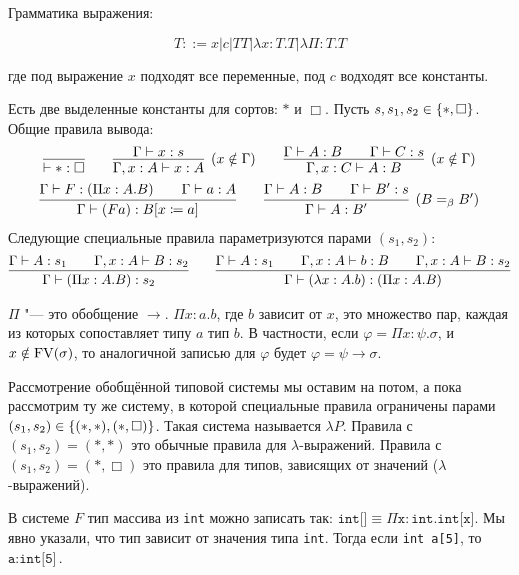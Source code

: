 \begin{definition}
Грамматика выражения:
\begin{bnf}
\[
    T ::= x | c | T T | \lambda x : T . T | \lambda \Pi : T . T
\]
\end{bnf}%
где под выражение $x$ подходят все переменные, под $c$ водходят все константы.

Есть две выделенные константы для сортов: $*$ и $\Box$.
Пусть $s, s_1, s_2 \in \left\{*, \Box\right\}$. Общие правила вывода:
\inferspacing
\begin{gather*}
    \infer{\vdash * : \Box}{} \qquad
    \infer[(x \notin \Gamma)]{\Gamma, x : A \vdash x : A}{\Gamma \vdash x : s} \qquad
    \infer[(x \notin \Gamma)]{\Gamma, x : C \vdash A : B}{\Gamma \vdash A : B && \Gamma \vdash C : s} \\
    \infer{\Gamma \vdash (Fa) : B [x \coloneqq a]}{\Gamma \vdash F : \left(\Pi x : A . B\right) && \Gamma \vdash a : A} \qquad
    \infer[(B =_\beta B')]{\Gamma \vdash A : B'}{\Gamma \vdash A : B \vphantom{(} && \Gamma \vdash B' : s} %
\end{gather*}%
Следующие специальные правила параметризуются парами $(s_1, s_2)$:
\begin{gather*}
    \infer{\Gamma \vdash (\Pi x : A . B) : s_2}{\Gamma \vdash A : s_1 && \Gamma, x : A \vdash B : s_2} \qquad
    \infer{\Gamma \vdash (\lambda x : A . b) : (\Pi x : A . B)}
            {\Gamma \vdash A : s_1 && \Gamma, x : A \vdash b : B && \Gamma, x : A \vdash B : s_2}
\end{gather*}
\end{definition}

$\Pi$ "--- это обобщение $\rightarrow$. $\Pi x : a . b$, где $b$ зависит от $x$, это множество пар,
каждая из которых сопоставляет типу $a$ тип $b$.
В частности, если $\varphi = \Pi x : \psi . \sigma$, и $x \notin \operatorname{FV}(\sigma)$,
то аналогичной записью для $\varphi$ будет $\varphi = \psi \rightarrow \sigma$.

Рассмотрение обобщённой типовой системы мы оставим на потом, а пока рассмотрим ту же систему,
в которой специальные правила ограничены парами $(s_1, s_2) \in \left\{(*, *), (*, \Box)\right\}$.
Такая система называется $\lambda P$.
Правила с $(s_1, s_2) = (*, *)$ это обычные правила для $\lambda$-выражений.
Правила с $(s_1, s_2) = (*, \Box)$ это правила для типов, зависящих от значений ($\lambda$-выражений).

В системе $F$ тип массива из \texttt{int} можно записать так:
$\texttt{int[]} \equiv \Pi \texttt{x} : \texttt{int}.\texttt{int[x]}$.
Мы явно указали, что тип зависит от значения типа \texttt{int}.
Тогда если \texttt{int a[5]}, то $\texttt{a}:\texttt{int[5]}$.

